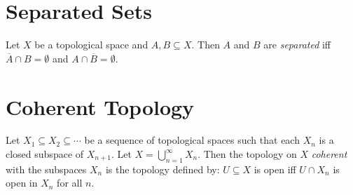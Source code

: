 \section{Separated Sets}

  \begin{df}
 Let $X$ be a topological space and $A, B \subseteq X$. Then $A$ and $B$ are
 \emph{separated} iff $\overline{A} \cap B = \emptyset$ and $A \cap
 \overline{B} = \emptyset$.
\end{df}

\section{Coherent Topology}

 \begin{df}
Let $X_1 \subseteq X_2 \subseteq \cdots$ be a sequence of topological spaces
such that each $X_n$ is a closed subspace of $X_{n+1}$. Let $X =
\bigcup_{n=1}^\infty X_n$. Then the topology on $X$ \emph{coherent} with the
subspaces $X_n$ is the topology defined by: $U \subseteq X$ is open iff $U
\cap  X_n$ is open in $X_n$ for all $n$.
\end{df}
